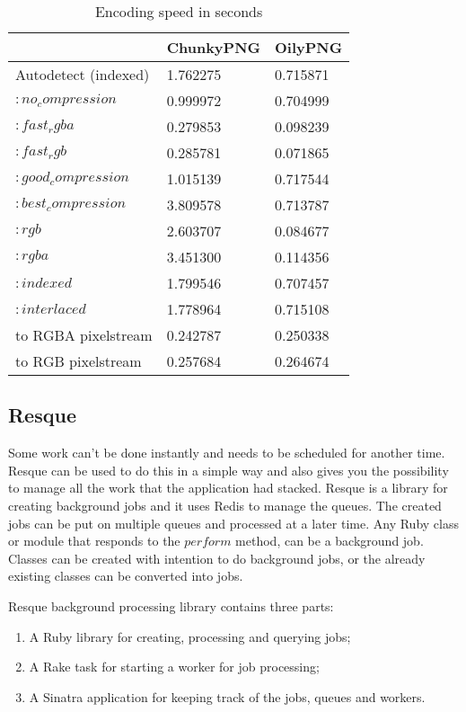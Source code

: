 \begin{table}[ht!]
\centering
\caption{Encoding speed in seconds}
{
\renewcommand{\arraystretch}{1.25}
\begin{tabular}{ lll }
                        & ChunkyPNG   &   OilyPNG \\ \hline
Autodetect (indexed)    & 1.762275    & 0.715871 \\
$:no_compression$       & 0.999972    & 0.704999 \\
$:fast_rgba$            & 0.279853    & 0.098239 \\
$:fast_rgb$             & 0.285781    & 0.071865 \\
$:good_compression$     & 1.015139    & 0.717544 \\
$:best_compression$     & 3.809578    & 0.713787 \\
$:rgb$                  & 2.603707    & 0.084677 \\
$:rgba$                 & 3.451300    & 0.114356 \\
$:indexed$              & 1.799546    & 0.707457 \\
$:interlaced$           & 1.778964    & 0.715108 \\
to RGBA pixelstream     & 0.242787    & 0.250338 \\
to RGB pixelstream      & 0.257684    & 0.264674 \\
\end{tabular}
}
\label{encoding_speed}
\end{table}



\subsection{Resque}
Some work can't be done instantly and needs to be scheduled for another time. Resque can be used to do this in a simple way and also gives you the possibility to manage all the work that the application had stacked.
Resque is a library for creating background jobs and it uses Redis to manage the queues. The created jobs can be put on multiple queues and processed at a later time.
Any Ruby class or module that responds to the $perform$ method, can be a background job. Classes can be created with intention to do background jobs, or the already existing classes can be converted into jobs.

Resque background processing library contains three parts:

\begin{enumerate}
  \item A Ruby library for creating, processing and querying jobs;
  \item A Rake task for starting a worker for job processing;
  \item A Sinatra application for keeping track of the jobs, queues and workers.
\end{enumerate}

